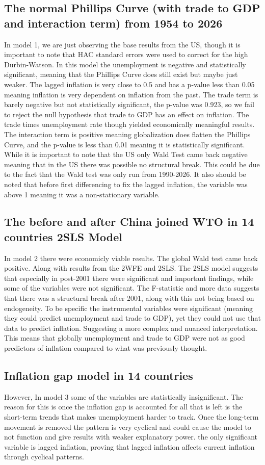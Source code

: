\documentclass{article}
\begin{document}
\subsection{The normal Phillips Curve (with trade to GDP and interaction term) from 1954 to 2026}
In model 1, we are just observing the base results from the US, though it is important to note that HAC standard errors were used to correct for the high Durbin-Watson. In this model the unemployment is negative and statistically significant, meaning that the Phillips Curve does still exist but maybe just weaker. The lagged inflation is very close to 0.5 and has a p-value less than 0.05 meaning inflation is very dependent on inflation from the past. The trade term is barely negative but not statistically significant, the p-value was 0.923, so we fail to reject the null hypothesis that trade to GDP has an effect on inflation. The trade times unemployment rate though yielded economically meaningful results. The interaction term is positive meaning globalization does flatten the Phillips Curve, and the p-value is less than 0.01 meaning it is statistically significant. While it is important to note that the US only Wald Test came back negative meaning that in the US there was possible no structural break. This could be due to the fact that the Wald test was only run from 1990-2026. It also should be noted that before first differencing to fix the lagged inflation, the variable was above 1 meaning it was a non-stationary variable.
\subsection{The before and after China joined WTO in 14 countries 2SLS Model}
In model 2 there were economicly viable results. The global Wald test came back positive. Along with results from the 2WFE and 2SLS. The 2SLS model suggests that especially in post-2001 there were significant and important findings, while some of the variables were not significant. The F-statistic and more data suggests that there was a structural break after 2001, along with this not being based on endogeneity. To be specific the instrumental variables were significant (meaning they could predict unemployment and trade to GDP), yet they could not use that data to predict inflation. Suggesting a more complex and nuanced interpretation. This means that globally unemployment and trade to GDP were not as good predictors of inflation compared to what was previously thought.
\subsection{Inflation gap model in 14 countries}
However, In model 3 some of the variables are statistically insignificant. The reason for this is once the inflation gap is accounted for all that is left is the short-term trends that makes unemployment harder to track. Once the long-term movement is removed the pattern is very cyclical and could cause the model to not function and give results with weaker explanatory power. the only significant variable is lagged inflation, proving that lagged inflation affects current inflation through cyclical patterns.
\end{document}
